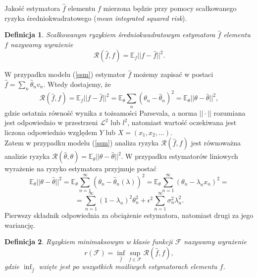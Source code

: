 \documentclass{article}
\newtheorem{df}{Definicja}
\begin{document}
Jakość estymatora $\hat{f}$ elementu $f$ mierzona będzie przy pomocy scałkowanego ryzyka średniokwadratowego (\textit{mean integrated squared risk}).
\begin{df}
Scałkowanym ryzykiem średniokwadratowym estymatora $\hat{f}$ elementu $f$ nazywamy wyrażenie
\begin{displaymath}
\mathcal{R}(\hat{f},f)=\mathbb{E}_f||f-\hat{f}||^2.
\end{displaymath}
\end{df}
W przypadku modelu (\ref{ssm}) estymator $\hat{f}$ możemy zapisać w postaci $\hat{f}=\sum_n\hat{\theta}_nv_n$. Wtedy dostajemy, że 
\begin{displaymath}
\mathcal{R}(\hat{f},f)=\mathbb{E}_f||f-\hat{f}||^2=\mathbb{E}_{\theta}\sum_n\left(\theta_n-\hat{\theta}_n\right)^2=\mathbb{E}_{\theta}||\theta-\hat{\theta}||^2,
\end{displaymath}
gdzie ostatnia równość wynika z tożsamości Parsevala, a norma $||\cdot ||$ rozumiana jest odpowiednio w przestrzeni $\mathcal{L}^2$ lub $l^2$, natomiast wartość oczekiwana jest liczona odpowiednio względem $Y$ lub $X=(x_1,x_2,\dots)$.\\
Zatem w przypadku modelu (\ref{ssm}) analiza ryzyka $\mathcal{R}(\hat{f},f)$ jest równoważna analizie ryzyka $\mathcal{R}(\hat{\theta},\theta)=\mathbb{E}_{\theta}||\theta-\hat{\theta}||^2$. W przypadku estymatorów liniowych wyrażenie na ryzyko estymatora przyjmuje postać 
\begin{displaymath}
\mathbb{E}_{\theta}||\theta-\hat{\theta}||^2=\mathbb{E}_{\theta}\sum_{n=1}^{\infty}\left(\theta_n-\hat{\theta}_n(\lambda)\right)^2=\mathbb{E}_{\theta}\sum_{n=1}^{\infty}\left(\theta_n-\lambda_nx_n\right)^2=
\end{displaymath}
\begin{equation}\label{risk}
=\sum_{n=1}^{\infty}(1-\lambda_n)^2\theta_n^2+\epsilon^2\sum_{n=1}^{\infty}\sigma_n^2\lambda_n^2.
\end{equation}
Pierwszy składnik odpowiednia za obciążenie estymatora, natomiast drugi za jego wariancję.\\
\begin{df}
Ryzykiem minimaksowym w klasie funkcji $\mathcal{F}$ nazywamy wyrażenie 
\begin{displaymath}
r(\mathcal{F})=\inf_{\hat{f}}\sup_{f\in \mathcal{F}}\mathcal{R}(\hat{f},f),
\end{displaymath}
gdzie $\inf_{\hat{f}}$ wzięte jest po wszystkich możliwych estymatorach elementu $f$.
\end{df}
\end{document}
